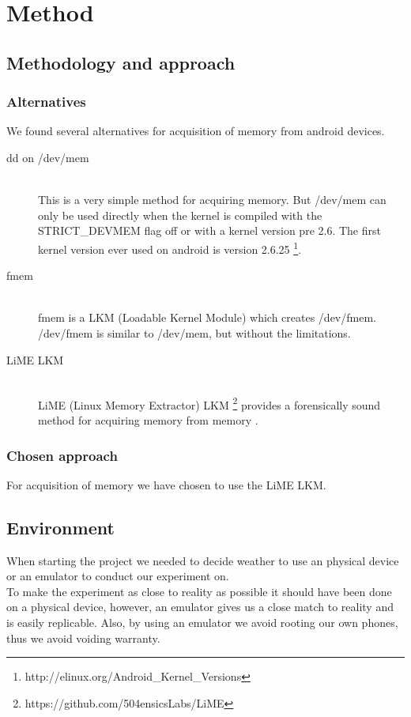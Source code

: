 \section{Method}
\subsection{Methodology and approach}
  \subsubsection{Alternatives}
  We found several alternatives for acquisition of memory from android devices.
  \begin{description}
    \item[dd on /dev/mem] \hfill \\
      This is a very simple method for acquiring memory. But /dev/mem can only be used directly when the kernel is 
      compiled with the STRICT\_DEVMEM flag off or with a kernel version pre 2.6. The first kernel version ever used on 
      android is version 2.6.25 \footnote{http://elinux.org/Android\_Kernel\_Versions}.
    \item[fmem] \hfill \\
      fmem is a LKM (Loadable Kernel Module) which creates /dev/fmem. /dev/fmem is similar to /dev/mem, but without the limitations.
    \item[LiME LKM] \hfill \\
      LiME (Linux Memory Extractor) LKM \footnote{https://github.com/504ensicsLabs/LiME} provides a forensically sound method for acquiring memory from 
      memory \cite{heriyanto2013procedures}.
  \end{description}
  \subsubsection{Chosen approach}
  For acquisition of memory we have chosen to use the LiME LKM.
\subsection{Environment}
When starting the project we needed to decide weather to use an physical device or an emulator
to conduct our experiment on.\\
To make the experiment as close to reality as possible it should have been done on a physical device, 
however, an emulator gives us a close match to reality and is easily replicable. Also, by using an emulator 
we avoid rooting our own phones, thus we avoid voiding warranty.
